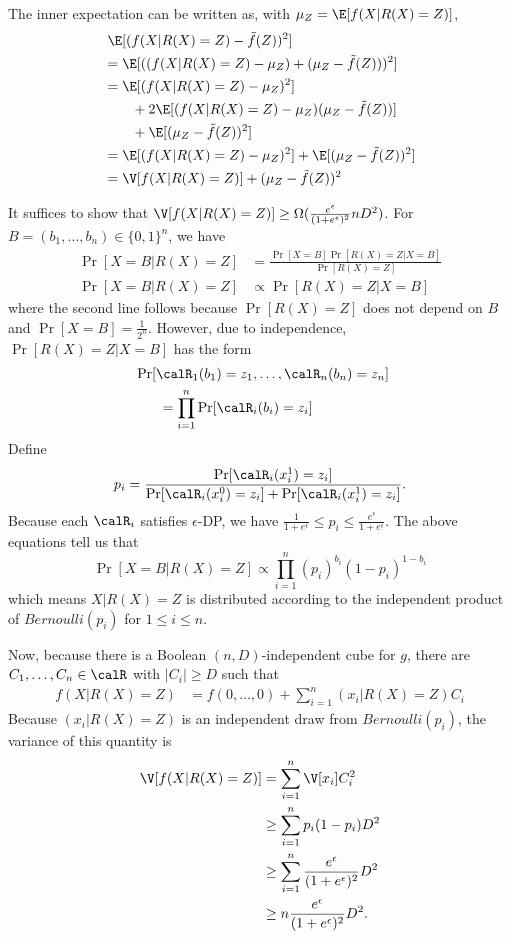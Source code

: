 The inner expectation can be written as, with $\mu_Z = \E[f(X|R(X)=Z)]$,
\begin{align*}
  &\; \E[(f(X|R(X)=Z) - \tilde{f}(Z) )^2] \\
  &= \E[( (f(X|R(X)=Z) - \mu_Z) + (\mu_Z - \tilde{f}(Z)) )^2] \\
  &= \E[(f(X|R(X)=Z) - \mu_Z)^2] \\
  &\qquad+ 2\E[(f(X|R(X)=Z) - \mu_Z)(\mu_Z - \tilde{f}(Z))] \\
  &\qquad+ \E[(\mu_Z - \tilde{f}(Z))^2] \\
  &= \E[(f(X|R(X)=Z) - \mu_Z)^2] + \E[(\mu_Z - \tilde{f}(Z))^2] \\
  &= \V[f(X|R(X)=Z)] + (\mu_Z - \tilde{f}(Z))^2
\end{align*}

It suffices to show that $\V[f(X|R(X)=Z)] \geq
\Omega(\frac{e^\epsilon}{(1+e^\epsilon)^2}nD^2)$.
For $B = (b_1, \ldots, b_n) \in \{0,1\}^n$, we have
\begin{align*}
  \Pr[X=B|R(X)=Z] &= \frac{\Pr[X=B]\Pr[R(X)=Z|X=B]}{\Pr[R(X)=Z]} \\
  \Pr[X=B|R(X)=Z] &\propto \Pr[R(X)=Z|X=B]
\end{align*}
where the second line follows because $\Pr[R(X)=Z]$ does not depend on $B$ and
$\Pr[X=B] = \frac{1}{2^n}$.
However, due to independence, $\Pr[R(X)=Z|X=B]$ has the form
\begin{align*}
  &\;\Pr[\calR_1(b_1) = z_1, \ldots, \calR_n(b_n) = z_n] \\
  &\qquad= \prod_{i=1}^n \Pr[\calR_i(b_i)=z_i]
\end{align*}
  Define 
  \[
    p_i = \frac{\Pr[\calR_i(x_i^{1})=z_i]}{\Pr[\calR_i(x_i^0)=z_i] +
    \Pr[\calR_i(x_i^1)=z_i]}.
  \]
  Because each $\calR_i$ satisfies
  $\epsilon$-DP, we have $\frac{1}{1+e^{\epsilon}} \leq p_i \leq
  \frac{e^\epsilon}{1+e^\epsilon}$.
  The above equations tell us that
  \[
    \Pr[X=B|R(X)=Z] \propto \prod_{i=1}^n (p_i)^{b_i}(1-p_i)^{1-b_i}
  \]
  which means $X|R(X)=Z$ is distributed according to the independent
  product of $Bernoulli(p_i)$ for $1 \leq i \leq n$.

  Now, because there is a Boolean $(n,D)$-independent cube for $g$, there are $C_1,
  \ldots, C_n \in \calR$ with $|C_i| \geq D$ such that
  \begin{align*}
    f(X | R(X)=Z) &= f(0, \ldots, 0) + \sum_{i=1}^n
    (x_i|R(X)=Z)C_i
  \end{align*}
  Because $(x_i|R(X)=Z)$ is an independent draw from $Bernoulli(p_i)$, the
  variance of this quantity is
  \begin{align*}
    \V[f(X|R(X)=Z)] &= \sum_{i=1}^n \V[x_i]C_i^2 \\
    &\geq \sum_{i=1}^n p_i(1-p_i) D^2 \\
    &\geq \sum_{i=1}^n \frac{e^\epsilon}{(1+e^\epsilon)^2} D^2 \\
    &\geq n \frac{e^\epsilon}{(1+e^\epsilon)^2} D^2.
  \end{align*}

% 
